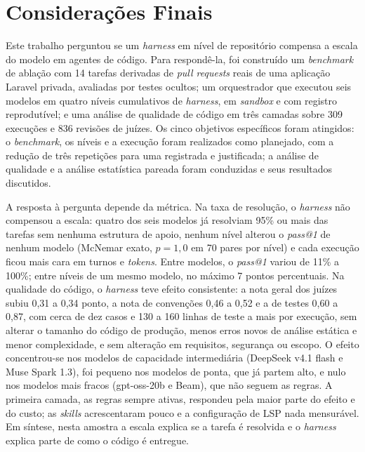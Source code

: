 
\section{Considerações Finais}
\label{sec:consideracoes}

Este trabalho perguntou se um \textit{harness} em nível de repositório compensa
a escala do modelo em agentes de código. Para respondê-la, foi construído um
\textit{benchmark} de ablação com 14 tarefas derivadas de \textit{pull requests}
reais de uma aplicação Laravel privada, avaliadas por testes ocultos; um
orquestrador que executou seis modelos em quatro níveis cumulativos de
\textit{harness}, em \textit{sandbox} e com registro reprodutível; e uma análise
de qualidade de código em três camadas sobre 309 execuções e 836 revisões de
juízes. Os cinco objetivos específicos foram atingidos: o \textit{benchmark}, os
níveis e a execução foram realizados como planejado, com a redução de três
repetições para uma registrada e justificada; a análise de qualidade e a
análise estatística pareada foram conduzidas e seus resultados discutidos.

A resposta à pergunta depende da métrica. Na taxa de resolução, o
\textit{harness} não compensou a escala: quatro dos seis modelos já resolviam
95\% ou mais das tarefas sem nenhuma estrutura de apoio, nenhum nível alterou o
\textit{pass@1} de nenhum modelo (McNemar exato, $p = 1{,}0$ em 70 pares por
nível) e cada execução ficou mais cara em turnos e \textit{tokens}. Entre
modelos, o \textit{pass@1} variou de 11\% a 100\%; entre níveis de um mesmo
modelo, no máximo 7 pontos percentuais. Na qualidade do código, o
\textit{harness} teve efeito consistente: a nota geral dos juízes subiu 0,31 a
0,34 ponto, a nota de convenções 0,46 a 0,52 e a de testes 0,60 a 0,87, com
cerca de dez casos e 130 a 160 linhas de teste a mais por execução, sem
alterar o tamanho do código de produção, menos erros novos de análise
estática e menor complexidade, e sem alteração em requisitos, segurança ou
escopo. O efeito concentrou-se nos modelos de capacidade intermediária
(DeepSeek v4.1 flash e Muse Spark 1.3), foi pequeno nos modelos de ponta, que
já partem alto, e nulo nos modelos mais fracos (gpt-oss-20b e Beam), que não
seguem as regras. A primeira camada, as regras sempre ativas, respondeu pela
maior parte do efeito e do custo; as \textit{skills} acrescentaram pouco e a
configuração de LSP nada mensurável. Em síntese, nesta amostra a escala
explica se a tarefa é resolvida e o \textit{harness} explica parte de como o
código é entregue.

